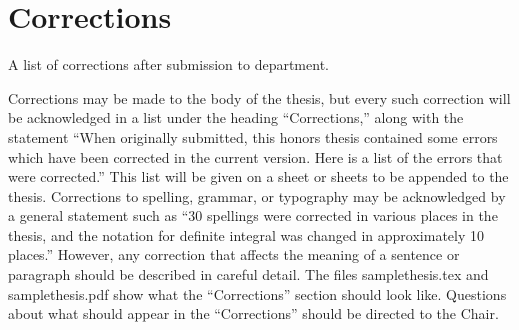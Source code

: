 \documentclass[12pt, twoside]{amherstthesis}
\newenvironment{Shaded}{\begin{snugshade}}{\end{snugshade}}
\newcommand{\AttributeTok}[1]{\textcolor[rgb]{0.13,0.29,0.53}{#1}}
\newcommand{\CommentTok}[1]{\textcolor[rgb]{0.56,0.35,0.01}{\textit{#1}}}
\newcommand{\DecValTok}[1]{\textcolor[rgb]{0.00,0.00,0.81}{#1}}
\newcommand{\FunctionTok}[1]{\textcolor[rgb]{0.13,0.29,0.53}{\textbf{#1}}}
\newcommand{\NormalTok}[1]{#1}
\newcommand{\OtherTok}[1]{\textcolor[rgb]{0.56,0.35,0.01}{#1}}
\newcommand{\SpecialCharTok}[1]{\textcolor[rgb]{0.81,0.36,0.00}{\textbf{#1}}}
\newcommand{\StringTok}[1]{\textcolor[rgb]{0.31,0.60,0.02}{#1}}
\begin{document}
\begin{Shaded}
\end{Shaded}
\normalsize

\hypertarget{corrections}{%
\chapter*{Corrections}\label{corrections}}

A list of corrections after submission to department.

Corrections may be made to the body of the thesis, but every such correction will be acknowledged in a list under the heading ``Corrections,'' along with the statement ``When originally submitted, this honors thesis contained some errors which have been corrected in the current version. Here is a list of the errors that were corrected.'' This list will be given on a sheet or sheets to be appended to the thesis. Corrections to spelling, grammar, or typography may be acknowledged by a general statement such as ``30 spellings were corrected in various places in the thesis, and the notation for definite integral was changed in approximately 10 places.'' However, any correction that affects the meaning of a sentence or paragraph should be described in careful detail. The files samplethesis.tex and samplethesis.pdf show what the ``Corrections'' section should look like. Questions about what should appear in the ``Corrections'' should be directed to the Chair.
\end{document}
